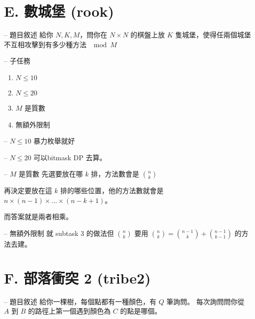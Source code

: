\documentclass[hyperref,UTF8,notheorems,xcolor={dvipsnames}]{beamer}
\newcommand{\btitle}[1]{{\secname} -- #1}
\theoremstyle{definition}
\begin{document}
\section{E. 數城堡 (rook)}

\begin{frame}[fragile]{\btitle{題目敘述}}
	給你 $N, K, M$，問你在 $N \times N$ 的棋盤上放 $K$ 隻城堡，使得任兩個城堡不互相攻擊到有多少種方法 $\mod M$

\end{frame}

\begin{frame}[fragile]{\btitle{子任務}}
	\begin{enumerate}
		\item $N \le 10$
		\item $N \le 20$
		\item $M$ 是質數
		\item 無額外限制
	\end{enumerate}
\end{frame}

\begin{frame}[fragile]{\btitle{$N \le 10$}}
	暴力枚舉就好

\end{frame}

\begin{frame}[fragile]{\btitle{$N \le 20$}}
	可以bitmask DP 去算。

\end{frame}

\begin{frame}[fragile]{\btitle{$M$ 是質數}}
	先選要放在哪 $k$ 排，方法數會是 $\binom{n}{k}$
	\pause

	再決定要放在這 $k$ 排的哪些位置，他的方法數就會是 $n \times (n - 1) \times ... \times (n - k + 1)$。 
	\pause

	而答案就是兩者相乘。
\end{frame}

\begin{frame}[fragile]{\btitle{無額外限制}}
	就 subtask 3 的做法但 $\binom{n}{k}$ 要用 $\binom{n}{k} = \binom{n - 1}{k} + \binom{n - 1}{k - 1}$ 的方法去建。
\end{frame}


\section{F. 部落衝突 2 (tribe2)}

\begin{frame}[fragile]{\btitle{題目敘述}}
	給你一棵樹，每個點都有一種顏色，有 $Q$ 筆詢問。
	每次詢問問你從 $A$ 到 $B$ 的路徑上第一個遇到顏色為 $C$ 的點是哪個。
\end{frame}
\end{document}

